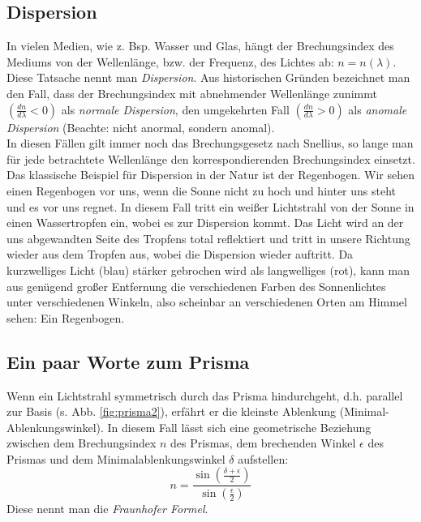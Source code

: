 \subsection{Dispersion}

In vielen Medien, wie z. Bsp. Wasser und Glas, hängt der Brechungsindex des Mediums von der Wellenlänge, bzw. der Frequenz, des Lichtes ab: $n = n(\lambda)$. Diese Tatsache nennt man \textit{Dispersion}. Aus historischen Gründen bezeichnet man den Fall, dass der Brechungsindex mit abnehmender Wellenlänge zunimmt $\left( \frac{dn}{d\lambda}<0\right)$ als \textit{normale Dispersion}, den umgekehrten Fall $\left( \frac{dn}{d\lambda}>0\right)$ als \textit{anomale Dispersion} (Beachte: nicht anormal, sondern anomal).\\
In diesen Fällen gilt immer noch das Brechungsgesetz nach Snellius, so lange man für jede betrachtete Wellenlänge den korrespondierenden Brechungsindex einsetzt.\\

\noindent
Das klassische Beispiel für Dispersion in der Natur ist der Regenbogen. Wir sehen einen Regenbogen vor uns, wenn die Sonne nicht zu hoch und hinter uns steht und es vor uns regnet. In diesem Fall tritt ein weißer Lichtstrahl von der Sonne in einen Wassertropfen ein, wobei es zur Dispersion kommt. Das Licht wird an der uns abgewandten Seite des Tropfens total reflektiert und tritt in unsere Richtung wieder aus dem Tropfen aus, wobei die Dispersion wieder auftritt. Da kurzwelliges Licht (blau) stärker gebrochen wird als langwelliges (rot), kann man aus genügend großer Entfernung die verschiedenen Farben des Sonnenlichtes unter verschiedenen Winkeln, also scheinbar an verschiedenen Orten am Himmel sehen: Ein Regenbogen.

\subsection{Ein paar Worte zum Prisma}

Wenn ein Lichtstrahl symmetrisch durch das Prisma hindurchgeht, d.h. parallel zur Basis (s. Abb. \ref{fig:prisma2}), erfährt er die kleinste Ablenkung (Minimal-Ablenkungswinkel). In diesem Fall lässt sich eine geometrische Beziehung zwischen dem Brechungsindex $n$ des Prismas, dem brechenden Winkel $\epsilon$ des Prismas und dem Minimalablenkungswinkel $\delta$ aufstellen:
\begin{equation} \label{eq:Brechungsindex}
n = \frac{\sin\left(\frac{\delta + \epsilon}{2}\right)}{\sin\left(\frac{\epsilon}{2}\right)}
\end{equation}
Diese nennt man die \textit{Fraunhofer Formel}.\\


